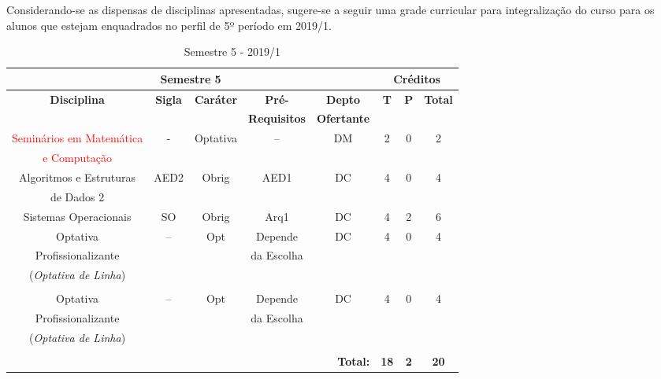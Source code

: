 \doublespacing

Considerando-se as dispensas de disciplinas apresentadas, sugere-se a seguir  uma grade curricular para integralização do curso para os alunos que estejam enquadrados no perfil de 5º período em 2019/1. 

\singlespacing


\begin{table}[H]
\caption{Semestre 5 - 2019/1}
\centering
\footnotesize
\begin{tabular}{|c|c|c|c|c|c|c|c|} %
\hline
\hline
\multicolumn{5}{|c|}{\textbf{Semestre 5}}  &  \multicolumn{3}{|c|}{\textbf{Créditos}} \\
\hline
\hline
\textbf{Disciplina} & \textbf{Sigla} & \textbf{Caráter} & \textbf{Pré-} & \textbf{Depto} &  \textbf{T}  &  \textbf{P}  & \textbf{Total} \\ 
& & & \textbf{Requisitos}  & \textbf{Ofertante} & & & \\
\hline 
\textcolor{red}{Seminários em Matemática} & - & Optativa & -- & DM  & 2 & 0 & 2 \\
\textcolor{red}{e Computação} & & & & & & & \\
\hline

Algoritmos e Estruturas & AED2 & Obrig & AED1 & DC  & 4 & 0 & 4 \\
de Dados 2 & & & & & & & \\
\hline

Sistemas Operacionais & SO & Obrig & Arq1 & DC  & 4 & 2 & 6 \\
\hline

Optativa & --  & Opt & Depende & DC  & 4 & 0 & 4 \\
Profissionalizante & & & da Escolha & & & & \\
(\textit{Optativa de Linha}) & & & & & & & \\
& & & & & & & \\
\hline

Optativa & --  & Opt & Depende & DC  & 4 & 0 & 4 \\
Profissionalizante & & & da Escolha & & & & \\
(\textit{Optativa de Linha}) & & & & & & & \\
& & & & & & & \\
\hline

\hline
\multicolumn{5}{|r|}{\textbf{Total:}}  &  \textbf{18}  &  \textbf{2}   & \textbf{20} \\ %
\hline
\hline
\end{tabular}
\label{tab:matriz3m2}
\end{table}


